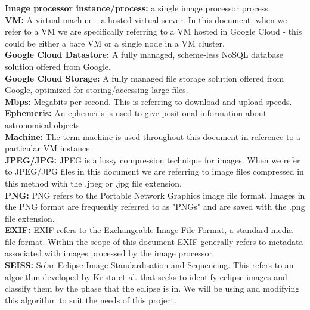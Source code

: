\documentclass[10pt, onecolumn, draftclsnofoot, letterpaper, compsoc]{IEEEtran}
\begin{document}
\noindent \textbf{Image processor instance/process:} a single image processor
process. \\

\noindent \textbf{VM:}  A virtual machine - a hosted virtual server. In this
document, when we refer to a VM we are specifically referring to a VM hosted in
Google Cloud - this could be either a bare VM or a single node in a VM cluster.\\

\noindent \textbf{Google Cloud Datastore:} A fully managed, scheme-less NoSQL
database solution offered from Google.\\

\noindent \textbf{Google Cloud Storage:}  A fully managed file storage solution
offered from Google, optimized for storing/accessing large files.\\

\noindent \textbf{Mbps:} Megabits per second. This is referring to download and
upload speeds.\\

\noindent \textbf{Ephemeris:} An ephemeris is used to give positional information
about astronomical objects\\

\noindent \textbf{Machine:} The term machine is used throughout this document in
reference to a particular VM instance.\\

\noindent \textbf{JPEG/JPG:}
JPEG is a lossy compression technique for images. When we refer
to JPEG/JPG files in this document we are referring to image files
compressed in this method with the .jpeg or .jpg file extension. \\

\noindent \textbf{PNG:}
PNG refers to the Portable Network Graphics image file format.
Images in the PNG format are frequently referred to as "PNGs" and are
saved with the .png file extension. \\

\noindent \textbf{EXIF:} EXIF refers to the Exchangeable Image File Format, a
standard  media file format. Within the scope of this document EXIF generally
refers to metadata associated with images processed by the image processor. \\

\noindent \textbf{SEISS:} Solar Eclipse Image Standardisation and Sequencing.
This refers to an algorithm developed by Krista et al. \cite{imgKrista} that
seeks to identify eclipse images and classify them by the phase that the
eclipse is in. We will be using and modifying this algorithm to suit the needs
of this project. \\



\end{document}
